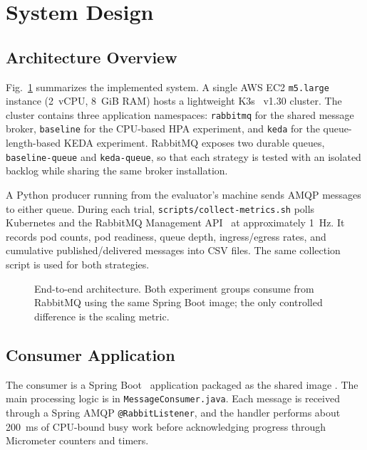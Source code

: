 \section{System Design}
\label{sec:design}

\subsection{Architecture Overview}
\label{subsec:arch}
Fig.~\ref{fig:arch} summarizes the implemented system. A single AWS EC2 \texttt{m5.large} instance (2~vCPU, 8~GiB RAM) hosts a lightweight K3s~\cite{rancher2024k3s} v1.30 cluster. The cluster contains three application namespaces: \texttt{rabbitmq} for the shared message broker, \texttt{baseline} for the CPU-based HPA experiment, and \texttt{keda} for the queue-length-based KEDA experiment. RabbitMQ exposes two durable queues, \texttt{baseline-queue} and \texttt{keda-queue}, so that each strategy is tested with an isolated backlog while sharing the same broker installation.

A Python producer running from the evaluator's machine sends AMQP messages to either queue. During each trial, \texttt{scripts/collect-metrics.sh} polls Kubernetes and the RabbitMQ Management API~\cite{broadcom2024rabbitmq} at approximately 1~Hz. It records pod counts, pod readiness, queue depth, ingress/egress rates, and cumulative published/delivered messages into CSV files. The same collection script is used for both strategies.

\begin{figure}[t]
  \centering
  
  \caption{End-to-end architecture. Both experiment groups consume from RabbitMQ using the same Spring Boot image; the only controlled difference is the scaling metric.}
  \label{fig:arch}
\end{figure}

\subsection{Consumer Application}
\label{subsec:consumer}
The consumer is a Spring Boot~\cite{vmware2024springboot} application packaged as the shared image . The main processing logic is in \texttt{MessageConsumer.java}. Each message is received through a Spring AMQP \texttt{@RabbitListener}, and the handler performs about 200~ms of CPU-bound busy work before acknowledging progress through Micrometer counters and timers.


